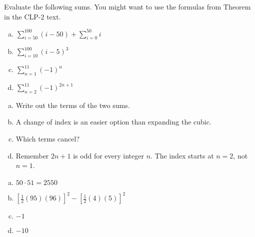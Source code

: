 \begin{question}\label{1.1sigmab}
Evaluate the following sums. You might want to use the formulas from Theorem~ in the CLP-2 text.
\begin{enumerate}[(a)]
\item $\displaystyle\sum_{i=50}^{100} (i-50)+\displaystyle\sum_{i=0}^{50} i$
\item $\displaystyle\sum_{i=10}^{100} \left(i-5\right)^3$
\item $\displaystyle\sum_{n=1}^{11} (-1)^n$
\item $\displaystyle\sum_{n=2}^{11} (-1)^{2n+1}$
\end{enumerate}
\end{question}
\begin{hint}
\begin{enumerate}[(a)]
\item Write out the terms of the two sums.
\item A change of index is an easier option than expanding the cubic.
\item Which terms cancel?
\item Remember $2n+1$ is odd for every integer $n$. The index starts at $n=2$, not $n=1$.
\end{enumerate}
\end{hint}
\begin{answer}
\begin{enumerate}[(a)]
\item $50\cdot 51=2550$
\item $\left[\frac{1}{2}(95)(96)\right]^2-\left[\frac{1}{2}(4)(5)\right]^2$
\item $-1$
\item $-10$
\end{enumerate}
\end{answer}
